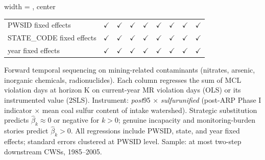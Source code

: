\begin{table}[htbp]
\begin{adjustbox}{width = \textwidth, center}
\begin{tabular}{lcccccccc}
          \\
         
         PWSID fixed effects                  & $\checkmark$  & $\checkmark$         & $\checkmark$  & $\checkmark$  & $\checkmark$  & $\checkmark$  & $\checkmark$  & $\checkmark$\\   
         STATE\_CODE fixed effects            & $\checkmark$  & $\checkmark$         & $\checkmark$  & $\checkmark$  & $\checkmark$  & $\checkmark$  & $\checkmark$  & $\checkmark$\\   
         year fixed effects                   & $\checkmark$  & $\checkmark$         & $\checkmark$  & $\checkmark$  & $\checkmark$  & $\checkmark$  & $\checkmark$  & $\checkmark$\\   
         
         \bottomrule
         
      \end{tabular}
      
      
      
   \end{adjustbox}
      {\tiny\linespread{1}\selectfont \par \raggedright 
   Forward temporal sequencing on mining-related contaminants (nitrates, arsenic, inorganic chemicals, radionuclides). Each column regresses the sum of MCL violation days at horizon K on current-year MR violation days (OLS) or its instrumented value (2SLS). Instrument: \textit{post}95$\,\times\,$\textit{sulfur\textunderscore unified} (post-ARP Phase I indicator $\times$ mean coal sulfur content of intake watershed). Strategic substitution predicts $\hat{\beta}_k \approx 0$ or negative for $k > 0$; genuine incapacity and monitoring-burden stories predict $\hat{\beta}_k > 0$. All regressions include PWSID, state, and year fixed effects; standard errors clustered at PWSID level. Sample: at most two-step downstream CWSs, 1985--2005.}
   
\end{table}


